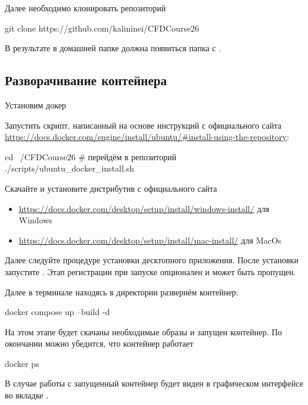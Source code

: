 Далее необходимо клонировать репозиторий

\begin{shelloutput}
git clone https://github.com/kalininei/CFDCourse26
\end{shelloutput}

В результате в домашней папке должна появиться папка с .

\subsection{Разворачивание контейнера}

Установим докер

\begin{tcolorbox}[osstyle, title=Ubuntu+apt]
Запустить скрипт, написанный на основе инструкций с официального сайта \url{https://docs.docker.com/engine/install/ubuntu/#install-using-the-repository}:
\begin{shelloutput}
cd ~/CFDCourse26    # перейдём в репозиторий
./scripts/ubuntu_docker_install.sh
\end{shelloutput}
\end{tcolorbox}

\begin{tcolorbox}[osstyle, title=Windows/MacOs+DockerDesktop]
Скачайте и установите дистрибутив с официального сайта 
\begin{itemize}
\item \url{https://docs.docker.com/desktop/setup/install/windows-install/} для Windows
\item \url{https://docs.docker.com/desktop/setup/install/mac-install/} для MacOs
\end{itemize}
Далее следуйте процедуре установки десктопного приложения.
После установки запустите .
Этап регистрации при запуске опционален и может быть пропущен.
\end{tcolorbox}

Далее в терминале находясь в директории  развернём контейнер:
\begin{shelloutput}
docker compose up --build -d
\end{shelloutput}
На этом этапе будет скачаны необходимые образы и запущен контейнер.
По окончании можно убедится, что контейнер работает
\begin{shelloutput}
docker ps
\end{shelloutput}
В случае работы с  запущенный контейнер будет виден в графическом интерфейсе во вкладке .

